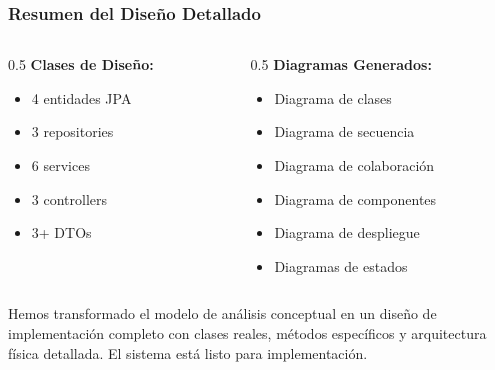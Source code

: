 \documentclass[aspectratio=169]{beamer}
\begin{document}
\begin{frame}
\frametitle{Resumen del Diseño Detallado}

\begin{columns}
\begin{column}{0.5\textwidth}
\textbf{Clases de Diseño:}
\begin{itemize}
\item 4 entidades JPA
\item 3 repositories
\item 6 services
\item 3 controllers
\item 3+ DTOs
\end{itemize}
\end{column}

\begin{column}{0.5\textwidth}
\textbf{Diagramas Generados:}
\begin{itemize}
\item Diagrama de clases
\item Diagrama de secuencia
\item Diagrama de colaboración
\item Diagrama de componentes
\item Diagrama de despliegue
\item Diagramas de estados
\end{itemize}
\end{column}
\end{columns}

\vspace{0.5cm}

\begin{tcolorbox}[colback=blue!5, colframe=blue!50, title=Objetivo Cumplido]
Hemos transformado el modelo de análisis conceptual en un diseño de implementación completo con clases reales, métodos específicos y arquitectura física detallada. El sistema está listo para implementación.
\end{tcolorbox}

\end{frame}
\end{document}
